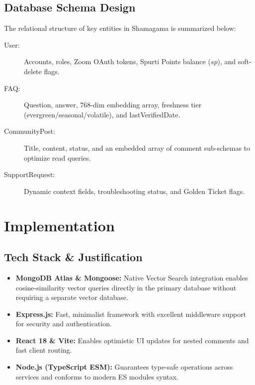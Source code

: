 \documentclass[11pt,a4paper]{article}
\begin{document}
\subsection{Database Schema Design}
The relational structure of key entities in Shamagama is summarized below:
\begin{description}
    \item[User:] Accounts, roles, Zoom OAuth tokens, Spurti Points balance ($sp$), and soft-delete flags.
    \item[FAQ:] Question, answer, 768-dim embedding array, freshness tier (evergreen/seasonal/volatile), and lastVerifiedDate.
    \item[CommunityPost:] Title, content, status, and an embedded array of comment sub-schemas to optimize read queries.
    \item[SupportRequest:] Dynamic context fields, troubleshooting status, and Golden Ticket flags.
\end{description}

\section{Implementation}
\subsection{Tech Stack \& Justification}
\begin{itemize}
    \item \textbf{MongoDB Atlas \& Mongoose:} Native Vector Search integration enables cosine-similarity vector queries directly in the primary database without requiring a separate vector database.
    \item \textbf{Express.js:} Fast, minimalist framework with excellent middleware support for security and authentication.
    \item \textbf{React 18 \& Vite:} Enables optimistic UI updates for nested comments and fast client routing.
    \item \textbf{Node.js (TypeScript ESM):} Guarantees type-safe operations across services and conforms to modern ES modules syntax.
\end{itemize}
\end{document}
